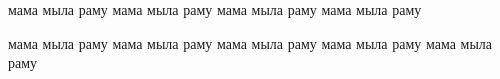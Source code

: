 \begin{center}
\WorkType

\Topic
\end{center}

мама мыла раму
мама мыла раму
мама мыла раму
мама мыла раму

                   мама                      мыла раму
мама мыла раму
										мама мыла раму
мама 					мыла раму
мама мыла раму